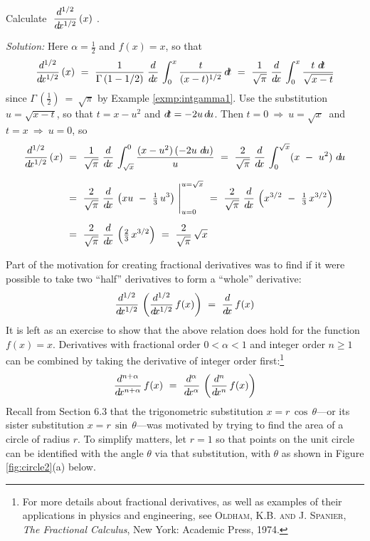 \begin{exmp}\label{exmp:halfderivx}
\noindent Calculate $~\dfrac{d^{1/2}}{d\!x^{1/2}}\,(x)~$.\vspace{1mm}
\par\noindent\emph{Solution:} Here $\alpha = \frac{1}{2}$ and $f(x)=x$, so that
\[
\frac{d^{1/2}}{d\!x^{1/2}}\,(x) ~=~ 
\frac{1}{\Gamma\,(1-1/2)}\;\frac{d}{d\!x}\,\int_0^x \frac{t}{(x-t)^{1/2}}\,d\!t ~=~
\frac{1}{\sqrt{\pi}}\;\frac{d}{d\!x}\,\int_0^x \frac{t~d\!t}{\sqrt{x-t}}
\]
since $\Gamma\,\left(\tfrac{1}{2}\right) ~=~ \sqrt{\pi}$ by Example
\ref{exmp:intgamma1}. Use the substitution $u=\sqrt{x-t}$,
so that $t=x-u^2$ and $d\!t=-2u\,d\!u$. Then $t=0~\Rightarrow~u=\sqrt{x}~$ and
$t=x~\Rightarrow~u=0$, so
\begin{align*}
\frac{d^{1/2}}{\dx^{1/2}}\,(x) ~&=~ 
\frac{1}{\sqrt{\pi}}\;\ddx\,\int_{\sqrt{x}}^0 \frac{(x-u^2)\,(-2u~\du)}{u}
~=~ \frac{2}{\sqrt{\pi}}\;\ddx\,\int_0^{\sqrt{x}} (x ~-~ u^2)~\du\\[6pt]
&=~ \frac{2}{\sqrt{\pi}}\;\ddx\,\left(xu ~-~ \tfrac{1}{3}\,u^3\right)~\Biggr|_{u=0}^{u=\sqrt{x}}
~=~ \frac{2}{\sqrt{\pi}}\;\ddx\,\left(x^{3/2} ~-~ \tfrac{1}{3}\,x^{3/2}\right)\\[6pt]
&=~ \frac{2}{\sqrt{\pi}}\;\ddx\,\left(\tfrac{2}{3}\,x^{3/2}\right)
~=~ \frac{2}{\sqrt{\pi}}\,\sqrt{x}
\end{align*}
\end{exmp}
\divider
\vspace{2mm}

\noindent Part of the motivation for creating fractional derivatives was to find
if it were possible to take two ``half'' derivatives to form a ``whole''
derivative:
\[
\frac{d^{1/2}}{d\!x^{1/2}}\,\left(\frac{d^{1/2}}{d\!x^{1/2}}\,f(x)\right) ~=~
\frac{d}{d\!x}\,f(x)
\]
It is left as an exercise to show that the above relation does hold for the
function $f(x) = x$. Derivatives with fractional order $0 < \alpha < 1$ and
integer order $n \ge 1$ can be combined by taking the derivative of integer
order first:\footnote{For more details about fractional derivatives, as well as
examples of their applications in physics and engineering, see
\textsc{Oldham, K.B. and J. Spanier}, \emph{The Fractional Calculus}, New York:
Academic Press, 1974.}
\[
\frac{d^{n+\alpha}}{d\!x^{n+\alpha}}\,f(x) ~=~
\frac{d^{\alpha}}{d\!x^{\alpha}}\,\left(\frac{d^{n}}{d\!x^{n}}\,f(x)\right)
\]
\newpage
Recall from Section 6.3 that the trigonometric substitution
$x=r\,\cos\,\theta$---or its sister substitution $x=r\,\sin\,\theta$---was
motivated by trying to find the area of a circle of radius $r$. To simplify
matters, let $r=1$ so that points on the unit circle can be identified with the
angle $\theta$ via that substitution, with $\theta$ as shown in Figure
\ref{fig:circle2}(a) below.


